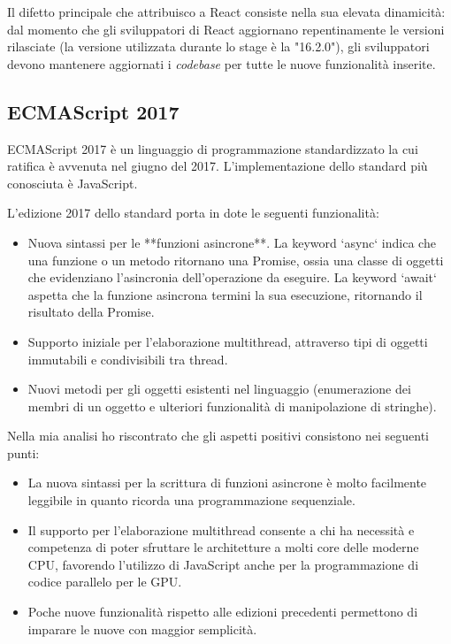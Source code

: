 Il difetto principale che attribuisco a React consiste nella sua elevata dinamicità: dal momento che gli sviluppatori di React aggiornano repentinamente le versioni rilasciate (la versione utilizzata durante lo stage è la "16.2.0"), gli sviluppatori devono mantenere aggiornati i \emph{codebase} per tutte le nuove funzionalità inserite.

\subsection{ECMAScript 2017}

ECMAScript 2017 è un linguaggio di programmazione standardizzato la cui ratifica è avvenuta nel giugno del 2017. L'implementazione dello standard più conosciuta è JavaScript.

L'edizione 2017 dello standard porta in dote le seguenti funzionalità:
\begin{itemize}
	\item Nuova sintassi per le **funzioni asincrone**. La keyword `async` indica che una funzione o un metodo ritornano una Promise, ossia una classe di oggetti che evidenziano l'asincronia dell'operazione da eseguire. La keyword `await` aspetta che la funzione asincrona termini la sua esecuzione, ritornando il risultato della Promise.
	\item Supporto iniziale per l'elaborazione multithread, attraverso tipi di oggetti immutabili e condivisibili tra thread.
	\item Nuovi metodi per gli oggetti esistenti nel linguaggio (enumerazione dei membri di un oggetto e ulteriori funzionalità di manipolazione di stringhe).
\end{itemize}

Nella mia analisi ho riscontrato che gli aspetti positivi consistono nei seguenti punti:
\begin{itemize}
	\item La nuova sintassi per la scrittura di funzioni asincrone è molto facilmente leggibile in quanto ricorda una programmazione sequenziale.
	\item Il supporto per l'elaborazione multithread consente a chi ha necessità e competenza di poter sfruttare le architetture a molti core delle moderne CPU, favorendo l'utilizzo di JavaScript anche per la programmazione di codice parallelo per le GPU.
	\item Poche nuove funzionalità rispetto alle edizioni precedenti permettono di imparare le nuove con maggior semplicità.
\end{itemize}

